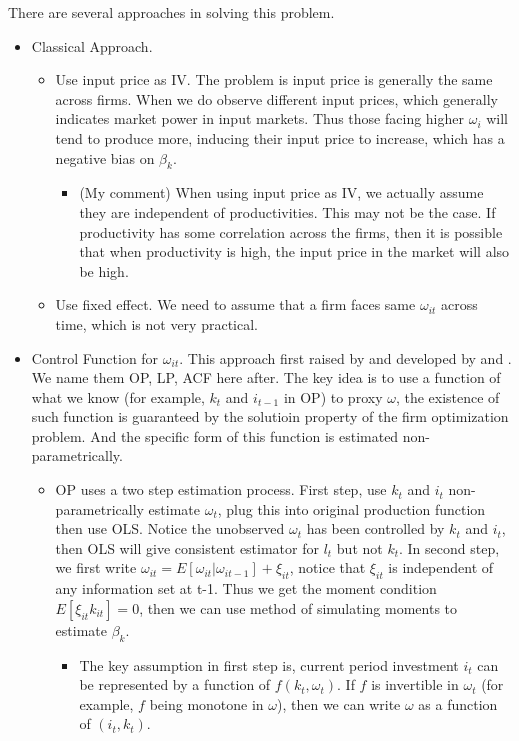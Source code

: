 \documentclass{book}
\theoremstyle{plain}
\theoremstyle{definition}
\begin{document}
There are several approaches in solving this problem.

\begin{itemize}
	\item Classical Approach.
	\begin{itemize}
		\item Use input price as IV. The problem is input price is generally the same across firms. When we do observe different input prices, which generally indicates market power in input markets. Thus those facing higher $\omega_i$ will tend to produce more, inducing their input price to increase, which has a negative bias on $\beta_k$.
		\begin{itemize}
			\item (My comment) When using input price as IV, we actually assume they are independent of productivities.
			This may not be the case.
			If productivity has some correlation across the firms,
			then it is possible that when productivity is high,
			the input price in the market will also be high.
		\end{itemize}
		\item Use fixed effect. We need to assume that a firm faces same $\omega_{it}$ across time, which is not very practical.
	\end{itemize}
	\item Control Function for  $\omega_{it}$. This approach first raised by \cite{Olley:1996ef} and developed by \cite{Levinsohn:2003ej} and \cite{Ackerberg:2015ha}. We name them OP, LP, ACF here after. The key idea is to use a function of what we know (for example, $k_t$ and $i_{t-1}$ in OP) to proxy $\omega$, the existence of such function is guaranteed by the solutioin property of the firm optimization problem. And the specific form of this function is estimated non-parametrically.
	\begin{itemize}
		\item OP uses a two step estimation process. First step, use $k_t$ and $i_{t}$ non-parametrically estimate $\omega_t$, plug this into original production function then use OLS. Notice the unobserved $\omega_t$ has been controlled by $k_t$ and $i_{t}$, then OLS will give consistent estimator for $l_t$ but not $k_t$. In second step, we first write $\omega_{it} = E[\omega_{it}|\omega_{it-1}]+\xi_{it}$, notice that $\xi_{it}$ is independent of any information set at t-1. Thus we get the moment condition $E[\xi_{it}k_{it}]=0$, then we can use method of simulating moments to estimate $\beta_k$.
		\begin{itemize}
			\item The key assumption in first step is, current period investment $i_t$ can be represented by a function of $f(k_t,\omega_t)$. 
			If $f$ is invertible in $\omega_t$ (for example, $f$ being monotone in $\omega$), then we can write $\omega$ as a function of $(i_t, k_t)$.
		\end{itemize}


\end{itemize}
\end{itemize}
\end{document}
